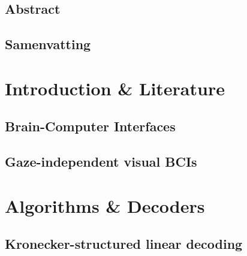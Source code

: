 %
\usepackage{todonotes}
\usepackage{hyperref}
\usepackage{tabularx}
\usepackage{booktabs}
\usepackage[inline]{enumitem}
\usepackage{subcaption}
\usepackage{algorithm}
\usepackage{algpseudocode}



\newcommand{\includechapter}[2]{
  \chapter{#1}
  \begin{refsection}
  
    \printbibliography[heading=subbibliography]
  \end{refsection}
  \clearpage
}

\newcommand{\comment}[1]{
  \todo[color=yellow]{#1}
}

\usepackage[backend=biber]{biblatex}






\frontmatter


\chapter{Abstract}

\chapter{Samenvatting}
\tableofcontents
\listoffigures
\listoftables
\printacronyms[name=List of acronyms]

\mainmatter%

\part{Introduction \& Literature}
\includechapter{Brain-Computer Interfaces}{chapters/bci.tex}
\includechapter{Gaze-independent visual BCIs}{chapters/gaze_independence.tex}

\part{Algorithms \& Decoders}
\includechapter{Kronecker-structured linear decoding}{chapters/stbf_struct.tex}

